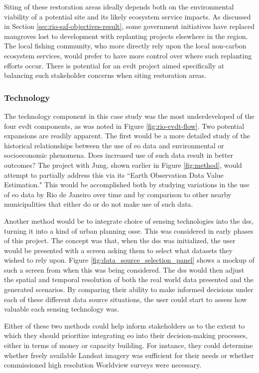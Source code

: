 Siting of these restoration areas ideally depends both on the environmental viability of a potential site and its likely ecosystem service impacts. As discussed in Section \ref{sec:rio-saf-objectives-result}, some government initiatives have replaced mangroves lost to development with replanting projects elsewhere in the region. The local fishing community, who more directly rely upon the local non-carbon ecosystem services, would prefer to have more control over where such replanting efforts occur. There is potential for an \ac{evdt} project aimed specifically at balancing such stakeholder concerns when siting restoration areas.


\subsubsection{Technology}

The technology component in this case study was the most underdeveloped of the four \ac{evdt} components, as was noted in Figure \ref{fig:rio-evdt-flow}. Two potential expansions are readily apparent. The first would be a more detailed study of the historical relationships between the use of \ac{eo} data and environmental or socioeconomic phenomena. Does increased use of such data result in better outcomes? The project with Jung, shown earlier in Figure \ref{fig:method}, would attempt to partially address this via its ``Earth Observation Data Value Estimation." This would be accomplished both by studying variations in the use of \ac{eo} data by Rio de Janeiro over time and by comparison to other nearby municipalities that either do or do not make use of such data. 

Another method would be to integrate choice of sensing technologies into the \ac{dss}, turning it into a kind of urban planning \ac{osse}. This was considered in early phases of this project. The concept was that, when the \ac{dss} was initialized, the user would be presented with a screen asking them to select what datasets they wished to rely upon. Figure \ref{fig:data_source_selection_panel} shows a mockup of such a screen from when this was being considered. The \ac{dss} would then adjust the spatial and temporal resolution of both the real world data presented and the generated scenarios. By comparing their ability to make informed decisions under each of these different data source situations, the user could start to assess how valuable each sensing technology was. 

Either of these two methods could help inform stakeholders as to the extent to which they should prioritize integrating \ac{eo} into their decision-making processes, either in terms of money or capacity building. For instance, they could determine whether freely available Landsat imagery was sufficient for their needs or whether commissioned high resolution Worldview surveys were necessary. 

